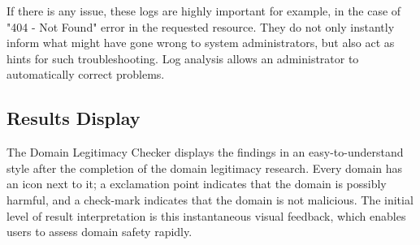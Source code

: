 If there is any issue, these logs are highly important for example, in the case of "404 - Not Found" error in the requested resource. They do not only instantly inform what might have gone wrong to system administrators, but also act as hints for such troubleshooting. Log analysis allows an administrator to automatically correct problems.

\subsection{Results Display}

The Domain Legitimacy Checker displays the findings in an easy-to-understand style after the completion of the domain legitimacy research. Every domain has an icon next to it; a  exclamation point indicates that the domain is possibly harmful, and a  check-mark indicates that the domain is not malicious. The initial level of result interpretation is this instantaneous visual feedback, which enables users to assess domain safety rapidly.

